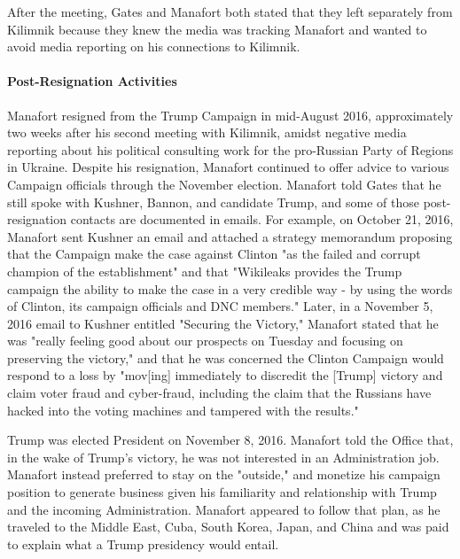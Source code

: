 After the meeting, Gates and Manafort both stated that they left separately from Kilimnik because they knew the media was tracking Manafort and wanted to avoid media reporting on his connections to Kilimnik.%

\paragraph{Post-Resignation Activities}

Manafort resigned from the Trump Campaign in mid-August 2016, approximately two weeks after his second meeting with Kilimnik, amidst negative media reporting about his political consulting work for the pro-Russian Party of Regions in Ukraine.
Despite his resignation, Manafort continued to offer advice to various Campaign officials through the November election.
Manafort told Gates that he still spoke with Kushner, Bannon, and candidate Trump,%
and some of those post-resignation contacts are documented in emails.
For example, on October 21, 2016, Manafort sent Kushner an email and attached a strategy memorandum proposing that the Campaign make the case against Clinton "as the failed and corrupt champion of the establishment" and that "Wikileaks provides the Trump campaign the ability to make the case in a very credible way - by using the words of Clinton, its campaign officials and DNC members."%
Later, in a November 5, 2016 email to Kushner entitled "Securing the Victory," Manafort stated that he was "really feeling good about our prospects on Tuesday and focusing on preserving the victory," and that he was concerned the Clinton Campaign would respond to a loss by "mov[ing] immediately to discredit the [Trump] victory and claim voter fraud and cyber-fraud, including the claim that the Russians have hacked into the voting machines and tampered with the results."%

Trump was elected President on November 8, 2016.
Manafort told the Office that, in the wake of Trump's victory, he was not interested in an Administration job.
Manafort instead preferred to stay on the "outside," and monetize his campaign position to generate business given his familiarity and relationship with Trump and the incoming Administration.%
Manafort appeared to follow that plan, as he traveled to the Middle East, Cuba, South Korea, Japan, and China and was paid to explain what a Trump presidency would entail.%

